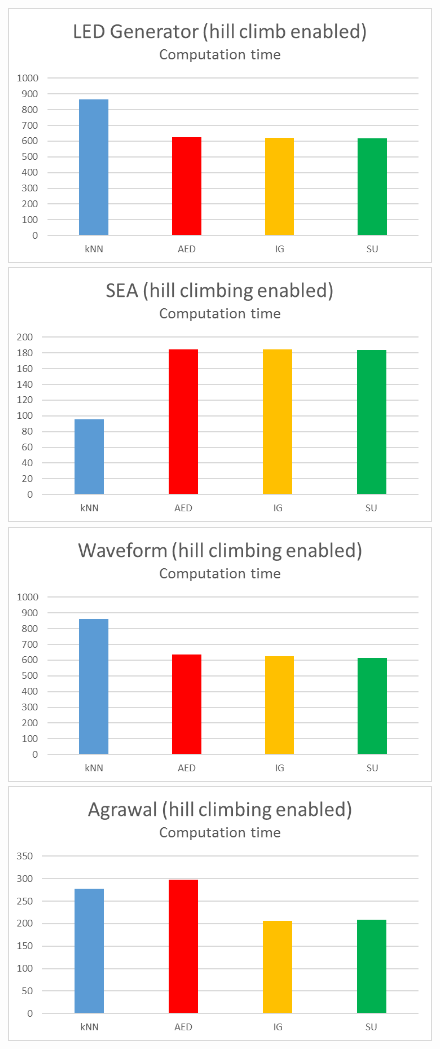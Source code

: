 \begin{figure}[h]
\centering 
\includegraphics[scale=0.17]{Graphs/LED/H_time}
\includegraphics[scale=0.17]{Graphs/SEA/H_time}
\includegraphics[scale=0.17]{Graphs/Waveform/H_time}
\includegraphics[scale=0.17]{Graphs/Agrawal/H_time}

\end{figure}
